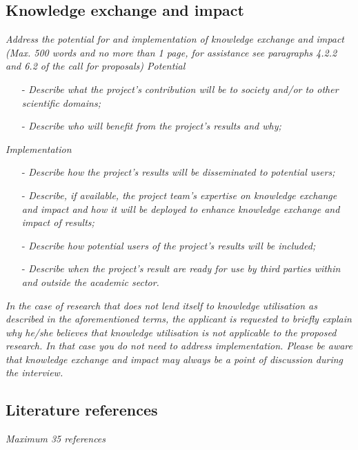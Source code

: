 \subsection{Knowledge exchange and impact}
\textit{Address the potential for and implementation of knowledge exchange and impact (Max. 500 words and no more than 1 page, for assistance see paragraphs 4.2.2 and 6.2 of the call for proposals) Potential}
\begin{itemize}
	\item[-] \textit{Describe what the project’s contribution will be to society and/or to other scientific domains;}
	\item[-] \textit{Describe who will benefit from the project’s results and why;}
\end{itemize}

\textit{Implementation}
\begin{itemize}
	\item[-] \textit{Describe how the project’s results will be disseminated to potential users;}
	\item[-] \textit{Describe, if available, the project team’s expertise on knowledge exchange and impact and how it will be deployed to enhance knowledge exchange and impact of results;}
	\item[-] \textit{Describe how potential users of the project’s results will be included;}
	\item[-] \textit{Describe when the project’s result are ready for use by third parties within and outside the academic sector.}
\end{itemize}

\textit{In the case of research that does not lend itself to knowledge utilisation as described in the aforementioned terms, the applicant is requested to briefly explain why he/she believes that knowledge utilisation is not applicable to the proposed research. In that case you do not need to address implementation. Please be aware that knowledge exchange and impact may always be a point of discussion during the interview.}

\subsection{Literature references}
\textit{Maximum 35 references}